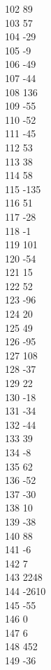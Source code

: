{ 102	89 \\
 103	57 \\
 104	-29 \\
 105	-9 \\
 106	-49 \\
 107	-44 \\
 108	136 \\
 109	-55 \\
 110	-52 \\
 111	-45 \\
 112	53 \\
 113	38 \\
 114	58 \\
 115	-135 \\
 116	51 \\
 117	-28 \\
 118	-1 \\
 119	101 \\
 120	-54 \\
 121	15 \\
 122	52 \\
 123	-96 \\
 124	20 \\
 125	49 \\
 126	-95 \\
 127	108 \\
 128	-37 \\
 129	22 \\
 130	-18 \\
 131	-34 \\
 132	-44 \\
 133	39 \\
 134	-8 \\
 135	62 \\
 136	-52 \\
 137	-30 \\
 138	10 \\
 139	-38 \\
 140	88 \\
 141	-6 \\
 142	7 \\
 143	2248 \\
 144	-2610 \\
 145	-55 \\
 146	0 \\
 147	6 \\
 148	452 \\
 149	-36 \\
}
